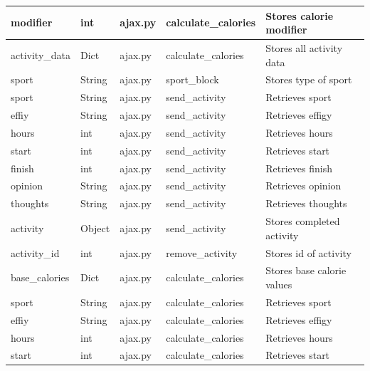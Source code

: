 \documentclass{article}[12pt,a4paper]
\begin{document}
\begin{longtable}{|l|l|l|l|l|}
modifier          & int         & ajax.py        & calculate\_calories & Stores calorie modifier     \\ \hline
activity\_data    & Dict        & ajax.py        & calculate\_calories & Stores all activity data            \\ \hline
sport             & String      & ajax.py        & sport\_block        & Stores type of sport                \\ \hline
sport             & String      & ajax.py        & send\_activity      & Retrieves sport                     \\ \hline
effiy             & String      & ajax.py        & send\_activity      & Retrieves effigy                    \\ \hline
hours             & int         & ajax.py        & send\_activity      & Retrieves hours                     \\ \hline
start             & int         & ajax.py        & send\_activity      & Retrieves start                     \\ \hline
finish            & int         & ajax.py        & send\_activity      & Retrieves finish                    \\ \hline
opinion           & String      & ajax.py        & send\_activity      & Retrieves opinion                   \\ \hline
thoughts          & String      & ajax.py        & send\_activity      & Retrieves thoughts                  \\ \hline
activity          & Object      & ajax.py        & send\_activity      & Stores completed activity           \\ \hline
activity\_id      & int         & ajax.py        & remove\_activity    & Stores id of activity           \\ \hline
base\_calories    & Dict        & ajax.py        & calculate\_calories & Stores base calorie values          \\ \hline
sport             & String      & ajax.py        & calculate\_calories & Retrieves sport                     \\ \hline
effiy             & String      & ajax.py        & calculate\_calories & Retrieves effigy                    \\ \hline
hours             & int         & ajax.py        & calculate\_calories & Retrieves hours                     \\ \hline
start             & int         & ajax.py        & calculate\_calories & Retrieves start                     \\ \hline

\end{longtable}
\end{document}
